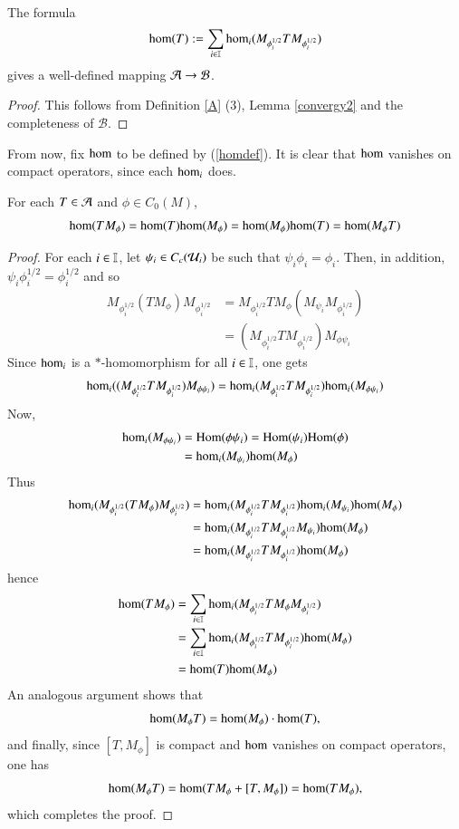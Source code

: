 \documentclass[leqno]{amsart}
\begin{document}
	\begin{lemma}\label{homconst}
		The formula
		\begin{equation}\label{homdef}
			{\rm hom}(T):=\sum_{i\in\mathbb I} {\rm hom}_i(M_{\phi_i^{1/2}}TM_{\phi_i^{1/2}})
		\end{equation}
		gives a well-defined mapping ${\mathcal A}\to{\mathcal B}$.
	\end{lemma}
	\begin{proof}
		This follows from Definition \ref{A} (3), Lemma \ref{convergy2} and the completeness of $\mathcal B$.
	\end{proof}
	
	From now, fix ${\rm hom}$ to be defined by (\ref{homdef}). It is clear that ${\rm hom}$ vanishes on compact operators, since each ${\rm hom}_i$ does.
	
	\begin{lemma}\label{multipliersout}
		For each $T\in{\mathcal A}$ and $\phi\in C_0(M)$, 
		$${\rm hom}(TM_\phi)={\rm hom}(T){\rm hom}(M_\phi)={\rm hom}(M_\phi){\rm hom}(T)={\rm hom}(M_\phi T)$$
	\end{lemma}
	\begin{proof}
		For each $i\in\mathbb I$, let $\psi_i\in C_c({\mathcal U}_i)$ be such that $\psi_i\phi_i=\phi_i$. Then, in addition, $\psi_i\phi_i^{1/2}=\phi_i^{1/2}$ and so
		\begin{align*}
			M_{\phi_i^{1/2}}(TM_\phi) M_{\phi_i^{1/2}}&=M_{\phi_i^{1/2}}TM_\phi (M_{\psi_i}M_{\phi_i^{1/2}})\\
			&=(M_{\phi_i^{1/2}}TM_{\phi_i^{1/2}})M_{\phi\psi_i}
		\end{align*}
		Since ${\rm hom}_i$ is a $*$-homomorphism for all $i\in\mathbb I$, one gets
		$${\rm hom}_i((M_{\phi_i^{1/2}}TM_{\phi_i^{1/2}}) M_{\phi\psi_i})={\rm hom}_i(M_{\phi_i^{1/2}}TM_{\phi_i^{1/2}}){\rm hom}_i(M_{\phi\psi_i})$$
		Now,
		\begin{align*}
			{\rm hom}_i(M_{\phi\psi_i})&={\rm Hom}(\phi\psi_i)={\rm Hom}(\psi_i){\rm Hom}(\phi)\\
			&={\rm hom}_i(M_{\psi_i}){\rm hom}(M_\phi)
		\end{align*}
		Thus
		\begin{align*}
			{\rm hom}_i(M_{\phi_i^{1/2}}(TM_\phi) M_{\phi_i^{1/2}})&={\rm hom}_i(M_{\phi_i^{1/2}}TM_{\phi_i^{1/2}}){\rm hom}_i(M_{\psi_i}){\rm hom}(M_\phi)\\
			&={\rm hom}_i(M_{\phi_i^{1/2}}TM_{\phi_i^{1/2}}M_{\psi_i}){\rm hom}(M_\phi)\\
			&={\rm hom}_i(M_{\phi_i^{1/2}}TM_{\phi_i^{1/2}}){\rm hom}(M_\phi)
		\end{align*}
		hence
		\begin{align*}
			{\rm hom}(TM_\phi)&=\sum_{i\in\mathbb I} {\rm hom}_i(M_{\phi_i^{1/2}}TM_\phi M_{\phi_i^{1/2}})\\
			&=\sum_{i\in\mathbb I} {\rm hom}_i(M_{\phi_i^{1/2}}T M_{\phi_i^{1/2}}){\rm hom}(M_\phi)\\
			&={\rm hom}(T){\rm hom}(M_\phi)
		\end{align*}
		An analogous argument shows that
		$${\rm hom}(M_\phi T)={\rm hom}(M_\phi)\cdot{\rm hom}(T),$$
		and finally, since $[T,M_\phi]$ is compact and ${\rm hom}$ vanishes on compact operators, one has
		$${\rm hom}(M_\phi T)={\rm hom}(TM_\phi+[T, M_\phi])={\rm hom}(TM_\phi),$$
		which completes the proof.
	\end{proof}
	
\end{document}
